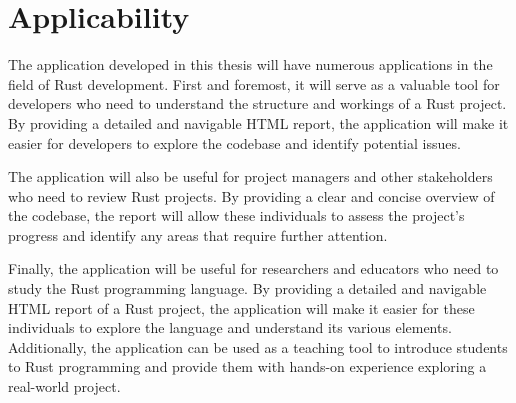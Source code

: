 \section{Applicability}

The application developed in this thesis will have numerous applications in the field of Rust development. First and foremost, it will serve as a valuable tool for developers who need to understand the structure and workings of a Rust project. By providing a detailed and navigable HTML report, the application will make it easier for developers to explore the codebase and identify potential issues.

The application will also be useful for project managers and other stakeholders who need to review Rust projects. By providing a clear and concise overview of the codebase, the report will allow these individuals to assess the project's progress and identify any areas that require further attention.

Finally, the application will be useful for researchers and educators who need to study the Rust programming language. By providing a detailed and navigable HTML report of a Rust project, the application will make it easier for these individuals to explore the language and understand its various elements. Additionally, the application can be used as a teaching tool to introduce students to Rust programming and provide them with hands-on experience exploring a real-world project.

